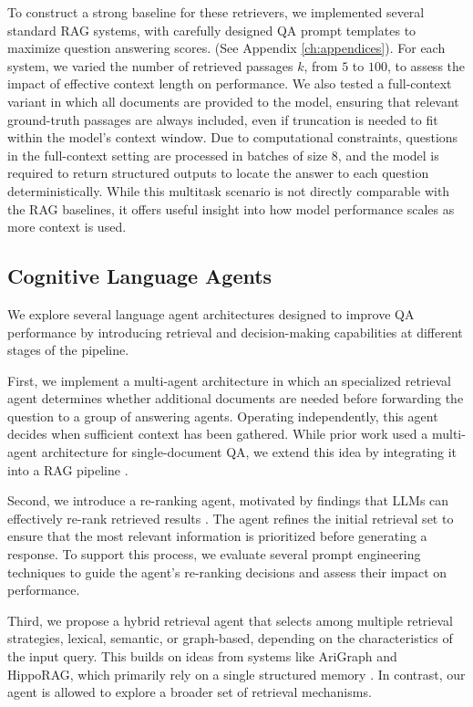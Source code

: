\noindent To construct a strong baseline for these retrievers, we implemented several standard RAG systems, with carefully designed QA prompt templates to maximize question answering scores. (See Appendix \ref{ch:appendices}). For each system, we varied the number of retrieved passages $k$, from $5$ to $100$, to assess the impact of effective context length on performance. We also tested a full-context variant in which all documents are provided to the model, ensuring that relevant ground-truth passages are always included, even if truncation is needed to fit within the model's context window. Due to computational constraints, questions in the full-context setting are processed in batches of size 8, and the model is required to return structured outputs to locate the answer to each question deterministically. While this multitask scenario is not directly comparable with the RAG baselines, it offers useful insight into how model performance scales as more context is used.

\subsection{Cognitive Language Agents}

We explore several language agent architectures designed to improve QA performance by introducing retrieval and decision-making capabilities at different stages of the pipeline.

\noindent First, we implement a multi-agent architecture in which an specialized retrieval agent determines whether additional documents are needed before forwarding the question to a group of answering agents. Operating independently, this agent decides when sufficient context has been gathered. While prior work used a multi-agent architecture for single-document QA, we extend this idea by integrating it into a RAG pipeline \cite{zhao-etal-2024-longagent}.

\noindent Second, we introduce a re-ranking agent, motivated by findings that LLMs can effectively re-rank retrieved results \cite{sun-etal-2023-chatgpt}. The agent refines the initial retrieval set to ensure that the most relevant information is prioritized before generating a response. To support this process, we evaluate several prompt engineering techniques to guide the agent's re-ranking decisions and assess their impact on performance.

\noindent Third, we propose a hybrid retrieval agent that  selects among multiple retrieval strategies, lexical, semantic, or graph-based, depending on the characteristics of the input query. This builds on ideas from systems like AriGraph and HippoRAG, which primarily rely on a single structured memory \cite{anokhin2024arigraphlearningknowledgegraph}\cite{NEURIPS2024_6ddc001d}. In contrast, our agent is allowed to explore a broader set of retrieval mechanisms.

